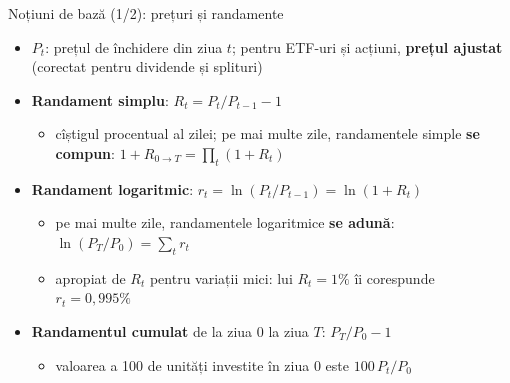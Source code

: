 \begin{frame}{Noțiuni de bază (1/2): prețuri și randamente}
\itemsize{\small}
\begin{itemize}
    \item $P_t$: prețul de închidere din ziua $t$; pentru ETF-uri și acțiuni, \textbf{prețul ajustat} (corectat pentru dividende și splituri)
    \item \textbf{Randament simplu}: $R_t = P_t / P_{t-1} - 1$
    \begin{itemize}
        \item cîștigul procentual al zilei; pe mai multe zile, randamentele simple \textbf{se compun}: $1 + R_{0\to T} = \prod_t (1 + R_t)$
    \end{itemize}
    \item \textbf{Randament logaritmic}: $r_t = \ln(P_t / P_{t-1}) = \ln(1 + R_t)$
    \begin{itemize}
        \item pe mai multe zile, randamentele logaritmice \textbf{se adună}: $\ln(P_T / P_0) = \sum_t r_t$
        \item apropiat de $R_t$ pentru variații mici: lui $R_t = 1\%$ îi corespunde $r_t = 0{,}995\%$
    \end{itemize}
    \item \textbf{Randamentul cumulat} de la ziua 0 la ziua $T$: $P_T / P_0 - 1$
    \begin{itemize}
        \item valoarea a 100 de unități investite în ziua 0 este $100 \, P_t / P_0$
    \end{itemize}
\end{itemize}
\end{frame}

